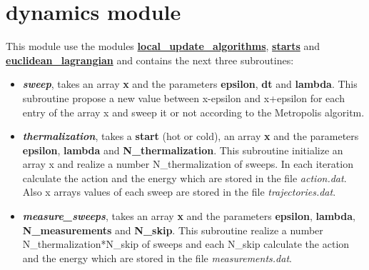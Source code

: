 \section{dynamics module}

This module use the modules \underline{\textbf{local\_update\_algorithms}}, \underline{\textbf{starts}} and \underline{\textbf{euclidean\_lagrangian}} and contains the next three subroutines:

\begin{itemize}
\item \textit{\textbf{sweep}}, takes an array \textbf{x} and the parameters \textbf{epsilon}, \textbf{dt} and \textbf{lambda}. This subroutine propose a new value between x-epsilon and x+epsilon for each entry of the array x and sweep it or not according to the Metropolis algoritm.

\item \textit{\textbf{thermalization}}, takes a \textbf{start} (hot or cold), an array \textbf{x} and the parameters \textbf{epsilon}, \textbf{lambda} and \textbf{N\_thermalization}. This subroutine initialize an array x and realize a number N\_thermalization of sweeps. In each iteration calculate the action and the energy which are stored in the file \textit{action.dat}. Also x arrays values of each sweep are stored in the file \textit{trajectories.dat}.

\item \textit{\textbf{measure\_sweeps}}, takes an array \textbf{x} and the parameters \textbf{epsilon}, \textbf{lambda}, \textbf{N\_measurements} and \textbf{N\_skip}. This subroutine realize a number N\_thermalization*N\_skip of sweeps and each N\_skip calculate the action and the energy which are stored in the file \textit{measurements.dat}.
\end{itemize}